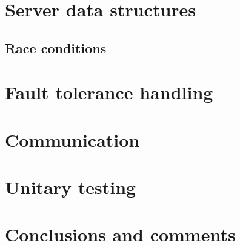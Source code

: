 \documentclass[a4paper]{article}
\begin{document}
	\section{Server data structures}

	\subsection{Race conditions}



	\section{Fault tolerance handling}



	\section{Communication}



	\section{Unitary testing}



	\section{Conclusions and comments}
\end{document}
